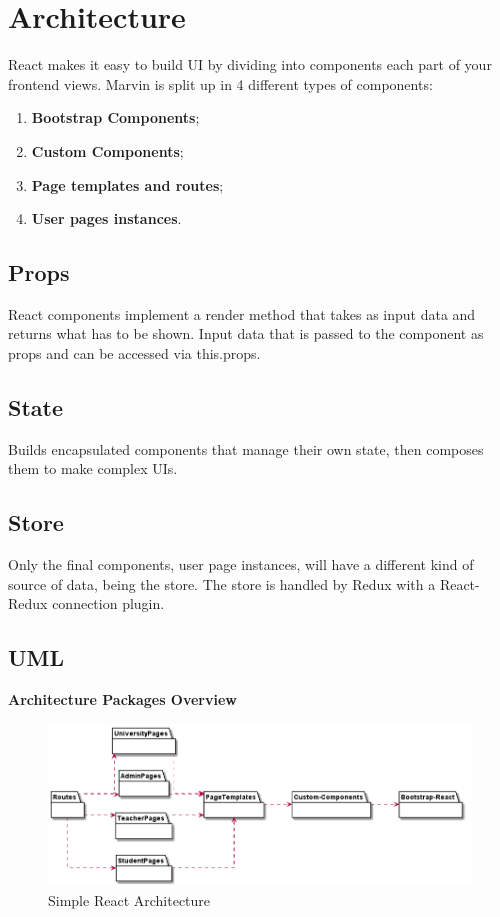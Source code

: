 \documentclass[../react]{subfiles}
\begin{document}
	
	\section{Architecture}

	React makes it easy to build UI by dividing into components each part of your frontend views.
	Marvin is split up in 4 different types of components:
	\begin{enumerate} 
		\item \textbf{Bootstrap Components};
		\item \textbf{Custom Components};
		\item \textbf{Page templates and routes};
		\item \textbf{User pages instances}.
	\end{enumerate} 

	\subsection{Props}
	React components implement a render method that takes as input data and returns what has to be shown.
	Input data that is passed to the component as props and can be accessed via this.props.

	\subsection{State}
	Builds encapsulated components that manage their own state, then composes them to make complex UIs.

	\subsection{Store}
	Only the final components, user page instances, will have a different kind of source of data, being the store.
	The store is handled by Redux with a React-Redux connection plugin.
	
	\subsection{UML} %
	
	\textbf{Architecture Packages Overview}
	\begin{figure}[H]
		\centering
		\includegraphics[width=1\linewidth]{"diagrammi/react/simplearch"}
		\caption{Simple React Architecture}
		\label{fig:Simple React Architecture}
	\end{figure}
	
\end{document}
